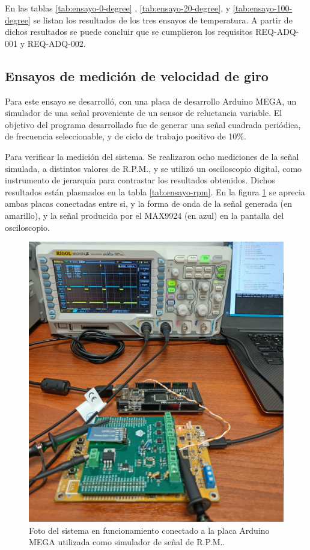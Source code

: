 En las tablas \ref{tab:ensayo-0-degree} , \ref{tab:ensayo-20-degree}, y \ref{tab:ensayo-100-degree} se listan los resultados de los tres ensayos de temperatura. A partir de dichos resultados se puede concluir que se cumplieron los requisitos REQ-ADQ-001 y REQ-ADQ-002.

\subsection{Ensayos de medición de velocidad de giro}

Para este ensayo se desarrolló, con una placa de desarrollo Arduino MEGA, un simulador de una señal proveniente de un sensor de reluctancia variable. El objetivo del programa desarrollado fue de generar una señal cuadrada periódica, de frecuencia seleccionable, y de ciclo de trabajo positivo de 10\%.

Para verificar la medición del sistema. Se realizaron ocho mediciones de la señal simulada, a distintos valores de R.P.M., y se utilizó un osciloscopio digital, como instrumento de jerarquía para contrastar los resultados obtenidos. Dichos resultados están plasmados en la tabla \ref{tab:ensayo-rpm}. En la figura \ref{fig:foto-rpm} se aprecia ambas placas conectadas entre si, y la forma de onda de la señal generada (en amarillo), y la señal producida por el MAX9924 (en azul) en la pantalla del osciloscopio.

\begin{figure}[htpb]
\centering
\includegraphics[width=.8\textwidth]{./Figures/foto-rpm.jpg}
\caption{Foto del sistema en funcionamiento conectado a la placa Arduino MEGA utilizada como simulador de señal de R.P.M..}
\label{fig:foto-rpm}
\end{figure}


